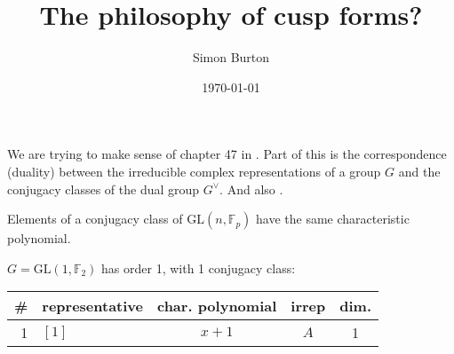 \documentclass[11pt,oneside]{article}
\title{The philosophy of cusp forms?}
\author{Simon Burton}
\date{\today}
\newcommand{\GL}{\mathrm{GL}}
\newcommand{\Field}{\mathbb{F}}
\begin{document}
\maketitle


We are trying to make sense of chapter 47 in \cite{Bump2004}.
Part of this is the correspondence (duality)
between the irreducible complex
representations of a group $G$ and the conjugacy classes of the dual group $G^{\vee}$.
And also \cite{Joyal1995}.

Elements of a 
conjugacy class of $\GL(n,\Field_p)$ have the same characteristic polynomial.



\setlength{\tabcolsep}{10pt}
\setlength{\arraycolsep}{1pt}
\renewcommand{\arraystretch}{0.5}


$G=\GL(1,\Field_2)$ has order 1, with 1 conjugacy class:
\begin{center}
\begin{tabular}{r|l|c|c|c}
\# & representative & char. polynomial & irrep & dim. \\
\hline
1 & $[1]$           & $x+1$            & $A$   & 1    \\
\end{tabular}
\end{center}
\end{document}
